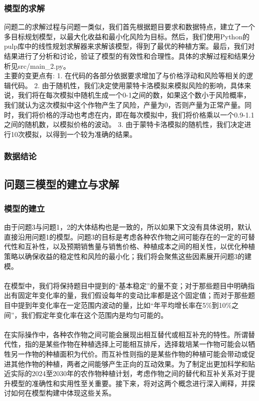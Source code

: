 \documentclass{cumcmthesis}
\begin{document}
\subsubsection{模型的求解}
问题二的求解过程与问题一类似，我们首先根据题目要求和数据特点，建立了一个多目标规划模型，以最大化收益和最小化风险为目标。然后，我们使用Python的pulp库中的线性规划求解器来求解该模型，得到了最优的种植方案。最后，我们对结果进行了分析和讨论，验证了模型的有效性和合理性。具体的求解过程和结果分析见src/main\_2.py。\\

主要的变更点有:
1. 在代码的各部分依据要求增加了与价格浮动和风险等相关的逻辑代码。
2. 由于随机性，我们决定使用蒙特卡洛模拟来模拟风险的影响，具体来说，我们将在每次模拟中随机生成一个0-1之间的数，如果这个数小于风险概率，我们就认为这次模拟中这个作物产生了风险，产量为0，否则产量为正常产量。同时，我们将价格的浮动也考虑在内，即在每次模拟中，我们将价格乘以一个0.9-1.1之间的随机数，以模拟价格的波动。
3. 由于蒙特卡洛模拟的随机性，我们决定进行10次模拟，以得到一个较为准确的结果。

\subsubsection{数据结论}



\subsection{问题三模型的建立与求解}
\subsubsection{模型的建立}
由于问题3与问题1，2的大体结构也是一致的，所以如果下文没有具体说明，默认直接沿用问题1的模型。问题3的目标是考虑各种农作物之间可能存在的一定的可替代性和互补性，以及预期销售量与销售价格、种植成本之间的相关性，以优化种植策略以确保收益的稳定性和风险的最小化；我们将会聚焦这些因素展开问题3的建模。\\\\
在模型中，我们将保持题目中提到的“基本稳定”的量不变；对于那些题目中明确指出有固定年变化率的量，我们假设每年的变动比率都是这个固定值；而对于那些题目中提到年变化率在一定范围内波动的量，比如“年平均增长率在5\%到10\%之间”，我们假定年变化率在这个范围内是均匀可能的。\\\\
在实际操作中，各种农作物之间可能会展现出相互替代或相互补充的特性。所谓替代性，指的是某些作物在种植选择上可能相互排斥，选择栽培某一作物可能会以牺牲另一作物的种植面积为代价。而互补性则指的是某些作物的种植可能会带动或促进其他作物的种植，两者之间能够产生正向的互动效果。为了制定出更加科学和贴近实际的2024至2030年的农作物种植计划，考虑作物之间的替代和互补关系对于提升模型的准确性和实用性至关重要。接下来，将对这两个概念进行深入阐释，并探讨如何在模型构建中体现这些关系。\\
\end{document}
